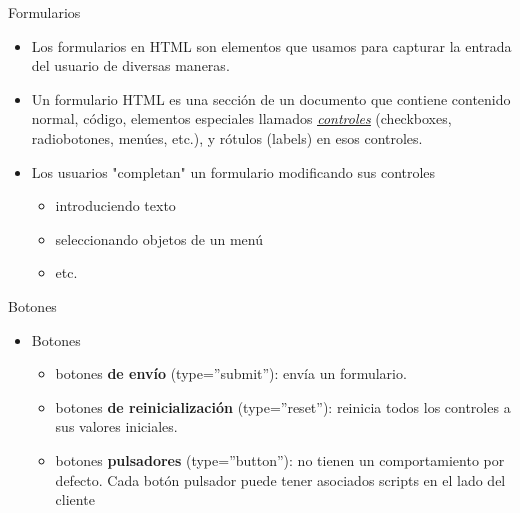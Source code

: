 \documentclass[aspectratio=43,10pt,t]{beamer}
\begin{document}
\begin{frame}{Formularios}\relax
\begingroup
{}
\begin{itemize}
  \item\relax Los formularios en HTML son elementos que usamos para capturar la entrada del usuario de diversas maneras.
  \item\relax Un formulario HTML es una sección de un documento que contiene contenido normal, código, elementos especiales llamados \href{http://html.conclase.net/w3c/html401-es/interact/forms.html\#form-controls}{\uline{\textit{controles}}} (checkboxes, radiobotones, menúes, etc.), y rótulos (labels) en esos controles. 
  \item\relax Los usuarios "completan" un formulario modificando sus controles 
  \begin{itemize}
    \item\relax introduciendo texto
    \item\relax seleccionando objetos de un menú
    \item\relax etc.
  \end{itemize}
\end{itemize}
\endgroup
\end{frame}

\begin{frame}{Botones}\relax
\begin{minipage}[t]{0.458\paperwidth}
\begingroup
{}
\begin{itemize}
  \item\relax Botones
  \begin{itemize}
    \item\relax botones \textbf{de envío} (type=”submit”): envía un formulario. 
    \item\relax botones \textbf{de reinicialización} (type=”reset”): reinicia todos los controles a sus valores iniciales.
    \item\relax botones \textbf{pulsadores} (type=”button”): no tienen un comportamiento por defecto. Cada botón pulsador puede tener asociados scripts en el lado del cliente
  \end{itemize}
\end{itemize}
\endgroup
\end{minipage}
\end{frame}
\end{document}
